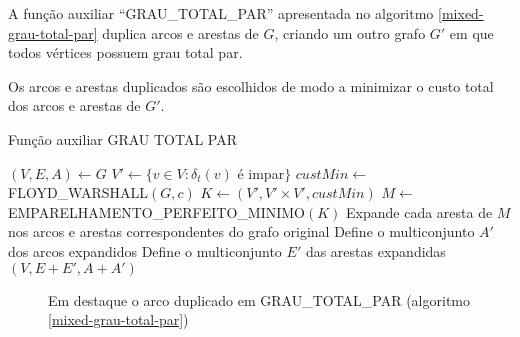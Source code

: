     A função auxiliar ``GRAU\_TOTAL\_PAR'' apresentada no algoritmo \ref{mixed-grau-total-par} duplica arcos e arestas de $G$, criando um outro grafo $G'$ em que todos vértices possuem grau total par.

    Os arcos e arestas duplicados são escolhidos de modo a minimizar o custo total dos arcos e arestas de $G'$.
    
    \begin{algorithm}
        \caption{Função auxiliar GRAU TOTAL PAR}
        \label{mixed-grau-total-par}
        \begin{algorithmic}[1]
            \State $(V, E, A) \gets G$
            \State $V' \gets \{v \in V : \delta_t(v)$ é impar$\}$
            \State $custMin \gets $ FLOYD\_WARSHALL$(G, c)$ 
            \State $K \gets (V', V' \times V', custMin)$ 
            \State $M \gets $ EMPARELHAMENTO\_PERFEITO\_MINIMO$(K)$
            \State Expande cada aresta de $M$ nos arcos e arestas correspondentes do grafo original
            \State Define o multiconjunto $A'$ dos arcos expandidos
            \State Define o multiconjunto $E'$ das arestas expandidas
            \State \Return $(V, E + E', A + A')$  
        \EndFunction
        \end{algorithmic}
    \end{algorithm}

    \begin{figure}[H]
        \centering
        \caption{Em destaque o arco duplicado em GRAU\_TOTAL\_PAR (algoritmo \ref{mixed-grau-total-par})}
        \label{mixed-exemplo-grau-total}
    \end{figure}

